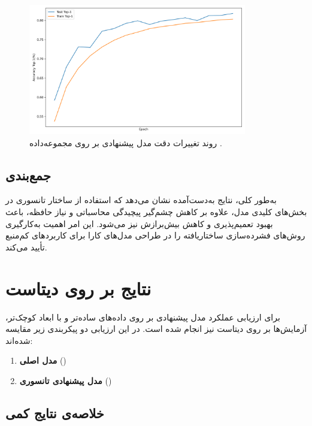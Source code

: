 \begin{figure}[ht]
	\centering
	\includegraphics[width=0.85\textwidth]{transformer_images/results/cifar10_tensorized.png}
	\caption{روند تغییرات دقت  مدل پیشنهادی  بر روی مجموعه‌داده .}
	\label{fig:cifar10_tensorized}
\end{figure}

\subsection{جمع‌بندی}

به‌طور کلی، نتایج به‌دست‌آمده نشان می‌دهد که استفاده از ساختار تانسوری در بخش‌های کلیدی مدل، علاوه بر کاهش چشم‌گیر پیچیدگی محاسباتی و نیاز حافظه، باعث بهبود تعمیم‌پذیری و کاهش بیش‌برازش نیز می‌شود.  
این امر اهمیت به‌کارگیری روش‌های فشرده‌سازی ساختاریافته را در طراحی مدل‌های کارا برای کاربردهای کم‌منبع تأیید می‌کند.







\section{نتایج بر روی دیتاست }

برای ارزیابی عملکرد مدل پیشنهادی بر روی داده‌های ساده‌تر و با ابعاد کوچک‌تر، آزمایش‌ها بر روی دیتاست  نیز انجام شده است. در این ارزیابی دو پیکربندی زیر مقایسه شده‌اند:
\begin{enumerate}
	\item \textbf{مدل اصلی} ()
	\item \textbf{مدل پیشنهادی تانسوری} ()
\end{enumerate}

\subsection{خلاصه‌ی نتایج کمی}

